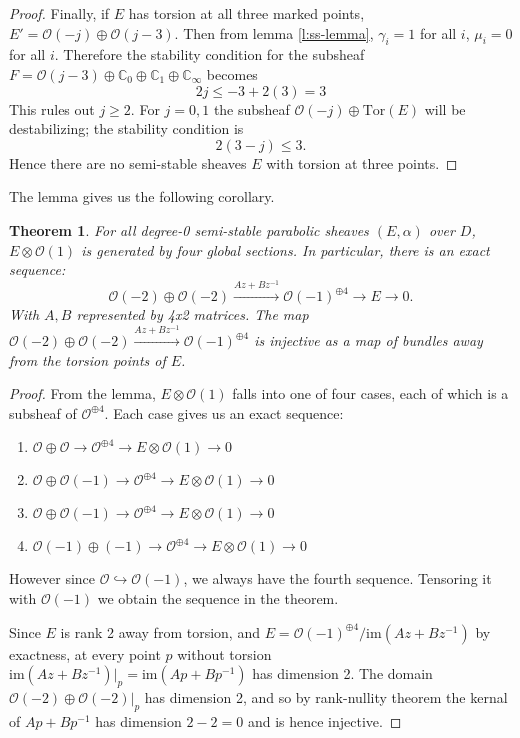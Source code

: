 \documentclass[]{article}
\newtheorem{theorem}{Theorem}
\newcommand{\C}{\mathbb{C}}
\newcommand{\OO}{\mathcal{O}}
\begin{document}
\begin{proof}
		Finally, if $E$ has torsion at all three marked points, $E' = \OO(-j)\oplus \OO(j-3)$. Then from lemma \ref{l:ss-lemma}, $\gamma_i = 1$ for all $i$, $\mu_i = 0$ for all $i$.  Therefore the stability condition for the subsheaf $F=\OO(j-3)\oplus\C_{0}\oplus \C_{1}\oplus \C_{\infty}$ becomes
		\begin{equation}
			2j \leq -3 + 2(3) = 3
		\end{equation}
		This rules out $j\geq 2$. For $j=0,1$ the subsheaf $\OO(-j)\oplus\text{Tor}(E)$ will be destabilizing; the stability condition is
		\begin{equation}
			2(3-j) \leq 3.
		\end{equation}
		Hence there are no semi-stable sheaves $E$ with torsion at three points.
	\end{proof}
	The lemma gives us the following corollary.
	\begin{theorem}
		For all degree-0 semi-stable parabolic sheaves $(E,\alpha)$ over $D$, $E\otimes \OO(1)$ is generated by four global sections. In particular, there is an exact sequence:
		\begin{equation}
		\OO(-2)\oplus \OO(-2) \xrightarrow{Az+Bz^{-1}} \OO(-1)^{\oplus 4} \xrightarrow{} E \to 0.
		\end{equation}
		With $A,B$ represented by 4x2 matrices. The map $\OO(-2)\oplus \OO(-2) \xrightarrow{Az+Bz^{-1}} \OO(-1)^{\oplus 4}$ is injective as a map of bundles away from the torsion points of $E$.
	\end{theorem}
	\begin{proof}
		From the lemma, $E\otimes \OO(1)$ falls into one of four cases, each of which is a subsheaf of $\OO^{\oplus 4}$. Each case gives us an exact sequence:
		\begin{enumerate}
			\item $\OO\oplus \OO\to \OO^{\oplus 4}\xrightarrow{} E\otimes\OO(1) \to 0$
			\item $\OO\oplus\OO(-1) \to \OO^{\oplus 4}\xrightarrow{} E\otimes\OO(1)  \to 0$
			\item $\OO\oplus\OO(-1) \to \OO^{\oplus 4}\xrightarrow{} E\otimes\OO(1) \to 0$
			\item $\OO(-1)\oplus (-1)\to \OO^{\oplus 4}\xrightarrow{} E\otimes\OO(1) \to 0$
		\end{enumerate}
		However since $\OO \hookrightarrow \OO(-1)$, we always have the fourth sequence. Tensoring it with $\OO(-1)$ we obtain the sequence in the theorem.
		
		Since $E$ is rank 2 away from torsion, and $E = \OO(-1)^{\oplus 4}/\text{im}(Az+Bz^{-1})$ by exactness, at every point $p$ without torsion $\text{im}(Az+Bz^{-1})|_p = \text{im}(Ap+Bp^{-1})$ has dimension 2. The domain $\OO(-2)\oplus\OO(-2)|_p$ has dimension 2, and so by rank-nullity theorem the kernal of $Ap+Bp^{-1}$ has dimension $2-2=0$ and is hence injective. 
	\end{proof}
\end{document}
